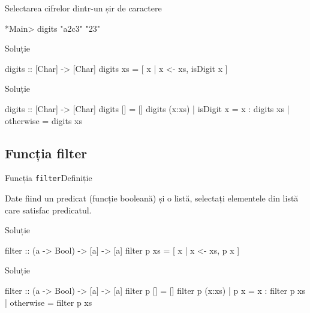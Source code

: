 \documentclass[xcolor=pdftex,romanian,colorlinks]{beamer}
\begin{document}
\begin{frame}[fragile]{Selectarea cifrelor dintr-un șir de caractere}
\begin{block}{}
\begin{asciihs}
*Main> digits "a2c3"
"23"
\end{asciihs}
\end{block}
\begin{block}{Soluție }
\begin{asciihs}
digits :: [Char] -> [Char]
digits xs = [ x | x <- xs, isDigit x ]
\end{asciihs}
\end{block}
\begin{block}{Soluție }
\begin{asciihs}
digits :: [Char] -> [Char]
digits []                 = []
digits (x:xs) | isDigit x = x : digits xs
              | otherwise = digits xs
\end{asciihs}
\end{block}
\end{frame}

\subsection{Funcția filter}

\begin{frame}[fragile]{Funcția \lstinline$filter$}{Definiție}
\begin{block}{}
Date fiind un predicat (funcție booleană) și o listă, selectați elementele din listă care satisfac predicatul.
\end{block}
\begin{block}{Soluție }
\begin{asciihs}
filter :: (a -> Bool) -> [a] -> [a]
filter p xs = [ x | x <- xs, p x ]
\end{asciihs}
\end{block}
\begin{block}{Soluție }
\begin{asciihs}
filter :: (a -> Bool) -> [a] -> [a]
filter p []                 = []
filter p (x:xs) | p x       = x : filter p xs
                | otherwise = filter p xs
\end{asciihs}
\end{block}
\end{frame}
\end{document}
